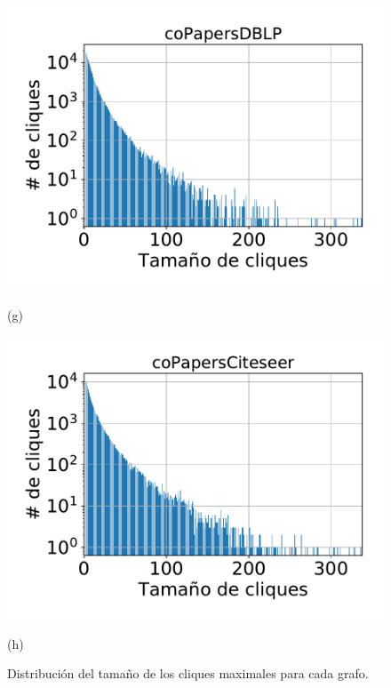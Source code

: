 \begin{figure}
{    	\begin{minipage}{1\textwidth}
    		\centering
    		\begin{minipage}{0.45\textwidth}
    			\centering
    			\includegraphics[width=1\linewidth]{img/cliqueDist2/coPapersDBLP.pdf}
    			
    			(g)
    		\end{minipage}
    		\begin{minipage}{0.45\textwidth}
    			\centering
    			\includegraphics[width=1\linewidth]{img/cliqueDist2/coPapersCiteseer.pdf}
    			
    			(h)
    		\end{minipage}  
    	\end{minipage}
    	
%    		
	}
     
    \caption{Distribución del tamaño de los cliques maximales para cada grafo.}
    \label{fig:cliqueDist2}
\end{figure}
